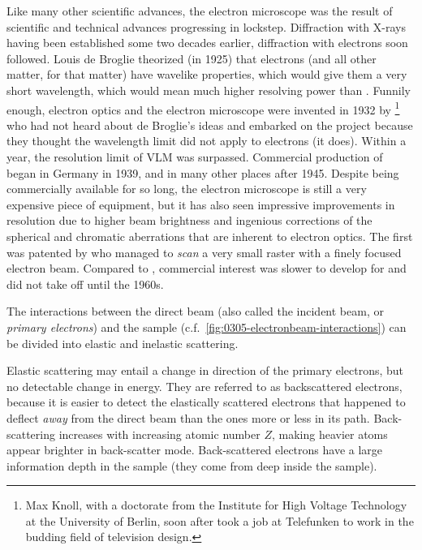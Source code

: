 \documentclass[draft,webedition,openright,titles,swedish,english]{LuaUUThesis}\usepackage[]{graphicx}\usepackage[]{xcolor}
\newcommand{\cf}{c.f.}
\begin{document}
Like many other scientific advances, the electron microscope was the result
of scientific and technical advances progressing in lockstep.
Diffraction with X-rays having been established some two decades earlier,
diffraction with electrons soon followed.
Louis de Broglie theorized (in 1925) that electrons (and all other matter,
for that matter) have wavelike properties, which would give them a very short
wavelength, which would mean much higher resolving power than .
Funnily enough, electron optics and the electron microscope were invented
in 1932 by \textcite{Knoll1932,Knoll1932a,Knoll1932b}%
\footnote{%
   Max Knoll, with a doctorate from the Institute for High Voltage Technology
   at the University of Berlin, soon after took a job at Telefunken to work in
   the budding field of television design.}
who had not heard about de Broglie's
ideas \cite{Williams1996} and embarked on the project because they thought the
wavelength limit did not apply to electrons (it does).
Within a year, the resolution limit of \gls{VLM} was surpassed.
Commercial production of  began in Germany in 1939,
and in many other places after 1945.
Despite being commercially available for so long, the electron microscope is still a very expensive
piece of equipment, but it has also seen impressive improvements in resolution
due to higher beam brightness and ingenious corrections of
the spherical and chromatic aberrations that are inherent to electron optics.
The first  was patented by \textcite{vonArdenne1939} who managed
to \emph{scan} a very small raster with a finely focused electron beam.
Compared to , commercial interest was slower to develop for
 and did not take off until the 1960s.

The interactions between the direct beam
(also called the incident beam, or \emph{primary electrons})
and the sample (\cf\ \cref{fig:0305-electronbeam-interactions})
can be divided into elastic and inelastic scattering.

Elastic scattering may entail a change in direction of the primary electrons,
but no detectable change in energy. They are referred to as backscattered electrons,
because it is easier to detect the elastically scattered electrons that happened
to deflect \emph{away} from the direct beam than the ones more or less in its path.
Back-scattering increases with increasing atomic number $Z$, making heavier atoms
appear brighter in back-scatter mode. Back-scattered electrons have a large information
depth in the sample  (they come from deep inside the sample).
\end{document}
